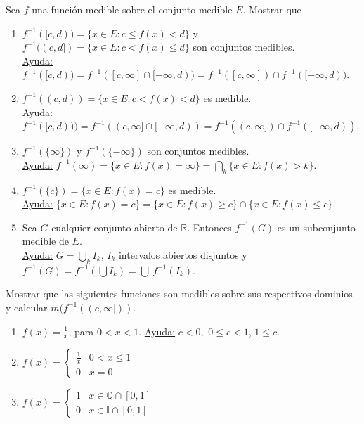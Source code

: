 \documentclass{book}
\newcommand{\rr}{\mathbb{R}}
\newcommand{\qq}{\mathbb{Q}}
\newcommand{\ii}{\mathbb{I}}
\begin{document}
	\begin{ejer}{} 
Sea $f$ una  funci\'on medible sobre el conjunto medible $E$. Mostrar que
\begin{enumerate}
\item $f^{-1}([c,d))=\{ x \in E: c\leq f(x)<d \}$ y 
$f^{-1}((c,d])=\{ x \in E: c< f(x)\leq d \}$ son conjuntos medibles.
\\
\underline{Ayuda:} $f^{-1}([c,d))=f^{-1}([c,\infty]\cap [-\infty,d))=f^{-1}([c,\infty])\cap f^{-1}( [-\infty,d)).$
\item  $f^{-1}((c,d))=\{ x \in E: c< f(x)<d \}$  es medible.
\\
\underline{Ayuda:} $f^{-1}([c,d)))=f^{-1}((c,\infty]\cap [-\infty,d))=f^{-1}((c,\infty])\cap f^{-1}( [-\infty,d)).$ 
\item  $f^{-1}(\{\infty\})$ y $f^{-1}(\{-\infty\})$ son conjuntos  medibles.
\\
\underline{Ayuda:} $f^{-1}({\infty})=\{ x \in E: f(x)=\infty \}=  \bigcap\limits_k \{ x \in E: f(x)>k\}.$ 
\item  $f^{-1}(\{c\})=\{x\in E: f(x)=c\}$ es medible. 
\\
\underline{Ayuda:} $\{ x \in E: f(x)=c \}=\{x \in E: f(x)\geq c\}  \cap \{ x \in E: f(x)\leq c\}.$ 
\item Sea $G$ cualquier conjunto abierto de $\rr$. Entonces $f^{-1}(G)$ es un subconjunto medible de $E$.
\\
\underline{Ayuda:} $G=\bigcup\limits_k I_k$, $I_k$ intervalos abiertos disjuntos y 
$f^{-1}(G)=f^{-1}(\bigcup I_k)=\bigcup\ f^{-1}(I_k)$.
\end{enumerate}
\end{ejer}


\begin{ejer}{} 
Mostrar que las siguientes funciones son medibles sobre sus respectivos dominios y calcular 
$m(f^{-1}((c,\infty]))$.
\begin{enumerate}
\item $f(x)=\frac{1}{x}$, para $0<x<1.$
\underline{Ayuda:} $c<0,$ $0\leq c<1$, $1\leq c$.
\item $f(x)=\left\{
\begin{array}{ll}
\frac{1}{x}&0<x\leq 1
\\
0&x=0
\end{array}
\right.$
\item $f(x)=\left\{
\begin{array}{ll}
1&x \in \qq \cap[0,1]
\\
0&x \in \ii\cap[0,1]
\end{array}
\right.
$
\end{enumerate}
\end{ejer}
\end{document}
